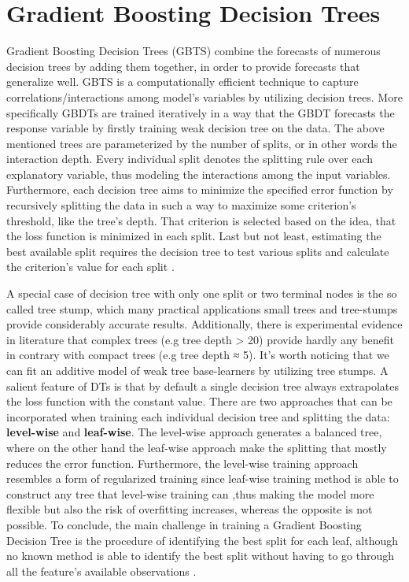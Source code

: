 \section{Gradient Boosting Decision Trees}
Gradient Boosting Decision Trees (GBTS) combine the forecasts of numerous decision trees by adding them together, in order to provide forecasts that generalize well. GBTS is a computationally efficient technique to capture correlations/interactions among model's variables by utilizing decision trees. More specifically GBDTs are trained iteratively in a way that the GBDT forecasts the response variable by firstly training weak decision tree on the data. The above mentioned trees are parameterized by the number of splits, or in other words the interaction depth. Every individual split denotes the splitting rule over each explanatory variable, thus modeling the interactions among the input variables. Furthermore, each decision tree aims to minimize the specified error function by recursively splitting the data in such a way to maximize some criterion's threshold, like the tree's depth. That criterion is selected based on the idea, that the loss function is minimized in each split. Last but not least, estimating the best available split requires the decision tree to test various splits and calculate the criterion's value for each split \cite{cook2016practical}. 
\par A special case of decision tree with only one split or two terminal nodes is the so called tree stump, which  many practical applications small trees and tree-stumps provide considerably accurate results. 
Additionally, there is experimental evidence in literature that complex trees (e.g tree depth > 20) provide hardly any benefit in contrary with compact trees (e.g tree depth ≈ 5). It's worth noticing that we can fit an additive model of weak tree base-learners by utilizing tree stumps. A salient feature of DTs is that by default a single decision tree always extrapolates the loss function with the constant value. 
There are two approaches that can be incorporated when training each individual decision tree and splitting the data: \textbf{level-wise} and \textbf{leaf-wise}. The level-wise approach generates a balanced tree, where on the other hand the leaf-wise approach make the splitting that mostly reduces the error function.  Furthermore, the level-wise training approach resembles a form of regularized training since leaf-wise training method is able to construct any tree that level-wise training can ,thus making the model more flexible but also the risk of overfitting increases, whereas the opposite is not possible. To conclude, the main challenge in training a Gradient Boosting Decision Tree is the procedure of identifying the best split for each leaf, although no known method is able to identify the best split without having to go through all the feature's available observations \cite{boehmke2019hands}.
\newpage
